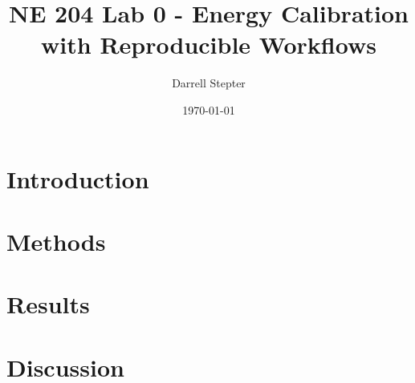 \documentclass[11pt]{article}
\title{NE 204 Lab 0 - Energy Calibration with Reproducible Workflows}
\author{Darrell Stepter}
\date{\today}
\begin{document}
\maketitle

\section*{Introduction}
\label{sec:intro}


\section*{Methods}
\label{sec:meth}


\section*{Results}
\label{sec:res}


\section*{Discussion}
\label{sec:disc}




\end{document}

